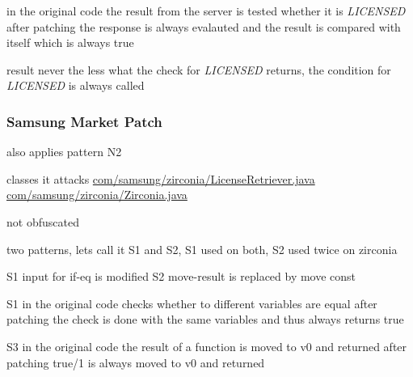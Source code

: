

in the original code the result from the server is tested whether it is \textit{LICENSED}
after patching the response is always evalauted and the result is compared with itself which is always true

result
never the less what the check for \textit{LICENSED} returns, the condition for \textit{LICENSED} is always called
\subsubsection{Samsung Market Patch}
also applies pattern N2

classes it attacks %
\url{com/samsung/zirconia/LicenseRetriever.java}
\url{com/samsung/zirconia/Zirconia.java}

not obfuscated

two patterns, lets call it S1 and S2, S1 used on both, S2 used twice on zirconia



S1
input for if-eq is modified
S2
move-result is replaced by move const


S1
in the original code checks whether to different variables are equal
after patching the check is done with the same variables and thus always returns true

S3
in the original code the result of a function is moved to v0 and returned
after patching true/1 is always moved to v0 and returned



